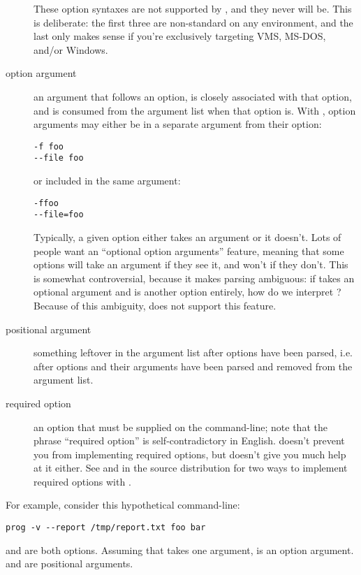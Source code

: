 \begin{description}
These option syntaxes are not supported by , and they never will
be.  This is deliberate: the first three are non-standard on any
environment, and the last only makes sense if you're exclusively
targeting VMS, MS-DOS, and/or Windows.
\item[option argument]
an argument that follows an option, is closely associated with that
option, and is consumed from the argument list when that option is.
With , option arguments may either be in a separate argument
from their option:
\begin{verbatim}
-f foo
--file foo
\end{verbatim}

or included in the same argument:
\begin{verbatim}
-ffoo
--file=foo
\end{verbatim}

Typically, a given option either takes an argument or it doesn't.
Lots of people want an ``optional option arguments'' feature, meaning
that some options will take an argument if they see it, and won't if
they don't.  This is somewhat controversial, because it makes parsing
ambiguous: if  takes an optional argument and  is
another option entirely, how do we interpret ?  Because of
this ambiguity,  does not support this feature.
\item[positional argument]
something leftover in the argument list after options have been
parsed, i.e. after options and their arguments have been parsed and
removed from the argument list.
\item[required option]
an option that must be supplied on the command-line; note that the
phrase ``required option'' is self-contradictory in English.  
doesn't prevent you from implementing required options, but doesn't
give you much help at it either.  See  and
 in the  source distribution for two
ways to implement required options with .
\end{description}

For example, consider this hypothetical command-line:
\begin{verbatim}
prog -v --report /tmp/report.txt foo bar
\end{verbatim}

 and  are both options.  Assuming that
 takes one argument,  is an option
argument.   and  are positional arguments.



